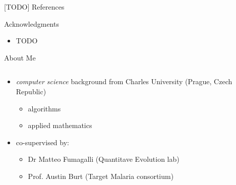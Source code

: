 \documentclass[final,hyperref={pdfpagelabels=false}]{beamer}
\begin{document}
\begin{frame}[t]
\begin{columns}[t]
\begin{column}{.465\textwidth}
\begin{block}{[TODO] References}
\small{
}

\end{block}


\begin{block}{Acknowledgments}

\begin{itemize}
\item TODO
\end{itemize}

\end{block}



\begin{block}{About Me}

\begin{columns} %

\begin{column}{.65\textwidth} %
\begin{itemize}
\item \emph{computer science} background from Charles University (Prague, Czech Republic)
    \begin{itemize}
    \item algorithms
    \item applied mathematics
    \end{itemize}
    
\item co-supervised by:
    \begin{itemize}
	\item Dr Matteo Fumagalli (Quantitave Evolution lab)
	\item Prof. Austin Burt (Target Malaria consortium)
    \end{itemize}
    

\end{itemize}
\end{column}
\end{columns}
\end{block}
\end{column}
\end{columns}
\end{frame}
\end{document}
